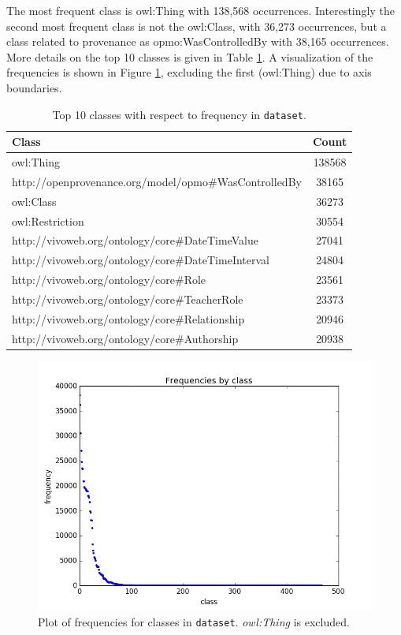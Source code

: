\documentclass[runningheads,a4paper]{../../StyleFiles/llncs}
\begin{document}
The most frequent class is owl:Thing with 138,568 occurrences. Interestingly the second most frequent class is not the owl:Class, with 36,273 occurrences, but a class related to provenance as opmo:WasControlledBy with 38,165 occurrences. More details on the top 10 classes is given in Table \ref{frequency_table}. A visualization of the frequencies is shown in Figure \ref{fig:frequency}, excluding the first (owl:Thing) due to axis boundaries.

\begin{table}[h]
	\begin{center}
		\begin{tabular}{| l | c |}
			\hline
			\textbf{Class} & \textbf{Count} \\ \hline
			owl:Thing &	138568 \\ \hline
			http://openprovenance.org/model/opmo\#WasControlledBy & 38165 \\ \hline
			owl:Class &	36273 \\ \hline
			owl:Restriction	& 30554 \\ \hline
			http://vivoweb.org/ontology/core\#DateTimeValue &	27041 \\ \hline
			http://vivoweb.org/ontology/core\#DateTimeInterval &	24804 \\ \hline
			http://vivoweb.org/ontology/core\#Role &	23561 \\ \hline
			http://vivoweb.org/ontology/core\#TeacherRole &	23373 \\ \hline
			http://vivoweb.org/ontology/core\#Relationship &	20946 \\ \hline
			http://vivoweb.org/ontology/core\#Authorship &	20938 \\ \hline
		\end{tabular}
		\caption{Top 10 classes with respect to frequency in \texttt{dataset}.}
		\label{frequency_table}
	\end{center}
\end{table}

\begin{figure}[h]
	\centering
	\includegraphics[width=.7\textwidth]{img/dataset_frequency.png}
	\caption{Plot of frequencies for classes in \texttt{dataset}. \textit{owl:Thing} is excluded.}
	\label{fig:frequency}
\end{figure}
\end{document}
